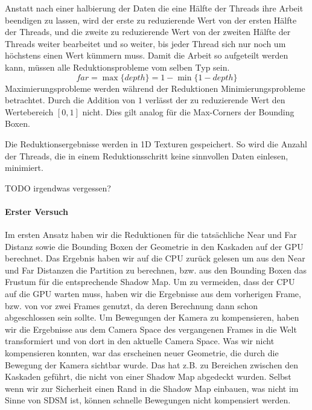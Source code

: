 \documentclass[runningheaders,a4paper]{llncs}
\begin{document}
Anstatt nach einer halbierung der Daten die eine Hälfte der Threads ihre Arbeit beendigen zu lassen, wird der erste zu reduzierende Wert von der ersten Hälfte der Threads, und die zweite zu reduzierende Wert von der zweiten Hälfte der Threads weiter bearbeitet und so weiter, bis jeder Thread sich nur noch um höchstens einen Wert kümmern muss.
Damit die Arbeit so aufgeteilt werden kann, müssen alle Reduktionsprobleme vom selben Typ sein.
\begin{equation}
  far = \max\{ depth \} = 1 - \min \{ 1 - depth \}
\end{equation}
Maximierungsprobleme werden während der Reduktionen Minimierungsprobleme betrachtet.
Durch die Addition von $1$ verlässt der zu reduzierende Wert den Wertebereich $[0, 1]$ nicht.
Dies gilt analog für die Max-Corners der Bounding Boxen.

Die Reduktionsergebnisse werden in 1D Texturen gespeichert.
So wird die Anzahl der Threads, die in einem Reduktionsschritt keine sinnvollen Daten einlesen, minimiert.




TODO irgendwas vergessen?


\paragraph{Erster Versuch}
Im ersten Ansatz haben wir die Reduktionen für die tatsächliche Near und Far Distanz sowie die Bounding Boxen der Geometrie in den Kaskaden auf der GPU berechnet.
Das Ergebnis haben wir auf die CPU zurück gelesen um aus den Near und Far Distanzen die Partition zu berechnen, bzw. aus den Bounding Boxen das Frustum für die entsprechende Shadow Map.
Um zu vermeiden, dass der CPU auf die GPU warten muss, haben wir die Ergebnisse aus dem vorherigen Frame, bzw. von vor zwei Frames genutzt, da deren Berechnung dann schon abgeschlossen sein sollte.
Um Bewegungen der Kamera zu kompensieren, haben wir die Ergebnisse aus dem Camera Space des vergangenen Frames in die Welt transformiert und von dort in den aktuelle Camera Space.
Was wir nicht kompensieren konnten, war das erscheinen neuer Geometrie, die durch die Bewegung der Kamera sichtbar wurde.
Das hat z.B. zu Bereichen zwischen den Kaskaden geführt, die nicht von einer Shadow Map abgedeckt wurden.
Selbst wenn wir zur Sicherheit einen Rand in die Shadow Map einbauen, was nicht im Sinne von SDSM ist, können schnelle Bewegungen nicht kompensiert werden.
\end{document}
